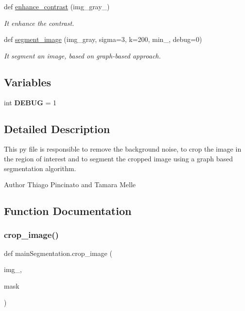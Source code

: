 \begin{DoxyCompactItemize}
def \hyperlink{namespacemainSegmentation_ae53d80a4b6e1524938318ad5657e0fad}{enhance\+\_\+contrast} (img\+\_\+gray\+\_\+)
\begin{DoxyCompactList}\small\item\em It enhance the contrast. \end{DoxyCompactList}\item 
def \hyperlink{namespacemainSegmentation_a909ab2c584028411a47d9d36dc5b484e}{segment\+\_\+image} (img\+\_\+gray, sigma=3, k=200, min\+\_, debug=0)
\begin{DoxyCompactList}\small\item\em It segment an image, based on graph-\/based approach. \end{DoxyCompactList}\end{DoxyCompactItemize}
\subsection*{Variables}
\begin{DoxyCompactItemize}
\item 
\mbox{\label{namespacemainSegmentation_a6fb0b020cafc5eb344270fa5b3598e28}} 
int {\bfseries D\+E\+B\+UG} = 1
\end{DoxyCompactItemize}


\subsection{Detailed Description}
This py file is responsible to remove the background noise, to crop the image in the region of interest and to segment the cropped image using a graph based segmentation algorithm. 

\begin{DoxyAuthor}{Author}
Thiago Pincinato and Tamara Melle 
\end{DoxyAuthor}


\subsection{Function Documentation}
\mbox{\label{namespacemainSegmentation_a616c4fb8355aa80f9c15c59e8fc03580}} 
\subsubsection{\texorpdfstring{crop\+\_\+image()}{crop\_image()}}
{\footnotesize\ttfamily def main\+Segmentation.\+crop\+\_\+image (\begin{DoxyParamCaption}\item[{}]{img\+\_\+,  }\item[{}]{mask }\end{DoxyParamCaption})}



